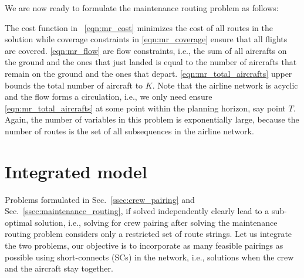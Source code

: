 \documentclass[letterpaper, 10pt, twocolumn, reqno]{amsart}
\begin{document}
We are now ready to formulate the maintenance routing problem as follows:

The cost function in ~\eqref{eqn:mr_cost} minimizes the cost of all routes in the solution while coverage constraints in \eqref{eqn:mr_coverage} ensure that
all flights are covered. \eqref{eqn:mr_flow} are flow constraints, i.e., the sum of all aircrafts on the ground and the ones that just landed is equal to the
number of aircrafts that remain on the ground and the ones that depart. \eqref{eqn:mr_total_aircrafts} upper bounds the total number of aircraft to $K$. Note
that the airline network is acyclic and the flow forms a circulation, i.e., we only need ensure \eqref{eqn:mr_total_aircrafts} at some point within the
planning horizon, say point $T$. Again, the number of variables in this problem is exponentially large, because the number of routes is the set of all
subsequences in the airline network.

\section{Integrated model}
\label{sec:integrated_model}
Problems formulated in Sec.~\ref{ssec:crew_pairing} and Sec.~\ref{ssec:maintenance_routing}, if solved independently clearly lead to a sub-optimal solution, i.e., solving for crew pairing after solving the maintenance routing problem considers only a restricted set of route strings. Let us integrate the two problems, our objective is to incorporate as many feasible pairings as possible using short-connects (SCs) in the network, i.e., solutions when the crew and the aircraft stay together.
\end{document}
